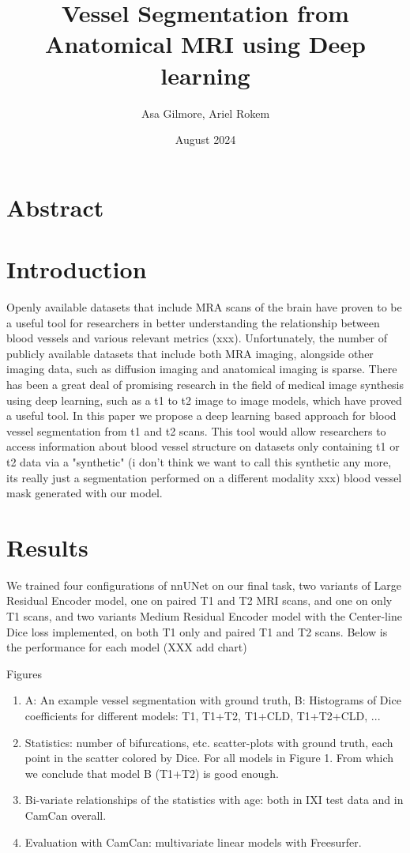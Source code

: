 \documentclass{article}
\title{Vessel Segmentation from Anatomical MRI using Deep learning}
\author{Asa Gilmore, Ariel Rokem}
\date{August 2024}
\begin{document}
\maketitle

\section{Abstract}

\section{Introduction}

Openly available datasets that include MRA scans of the brain have proven to be a useful tool for researchers in better understanding the relationship between blood vessels and various relevant metrics (xxx). Unfortunately, the number of publicly available datasets that include both MRA imaging, alongside other imaging data, such as diffusion imaging and anatomical imaging is sparse. There has been a great deal of promising research in the field of medical image synthesis using deep learning, such as a t1 to t2 image to image models, which have proved a useful tool. In this paper we propose a deep learning based approach for blood vessel segmentation from t1 and t2 scans. This tool would allow researchers to access information about blood vessel structure on datasets only containing t1 or t2 data via a "synthetic" (i don't think we want to call this synthetic any more, its really just a segmentation performed on a different modality xxx) blood vessel mask generated with our model.

\section{Results}

We trained four configurations of nnUNet on our final task, two variants of Large Residual Encoder model, one on paired T1 and T2 MRI scans, and one on only T1 scans, and two variants Medium Residual Encoder model with the Center-line Dice loss implemented, on both T1 only and paired T1 and T2 scans. Below is the performance for each model (XXX add chart)

Figures 
\begin{enumerate}
    \item A: An example vessel segmentation with ground truth, B: Histograms of Dice coefficients for different models: T1, T1+T2, T1+CLD, T1+T2+CLD, ... 
    \item Statistics: number of bifurcations, etc. scatter-plots with ground truth, each point in the scatter colored by Dice. For all models in Figure 1. From which we conclude that model B (T1+T2) is good enough.
    \item Bi-variate relationships of the statistics with age: both in IXI test data and in CamCan overall.  
    \item Evaluation with CamCan: multivariate linear models with Freesurfer.
\end{enumerate}
\end{document}
